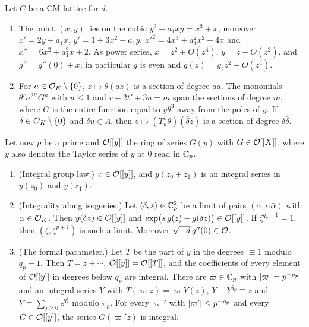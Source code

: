 \begin{theorem}\label{thm:cm-background}
Let $C$ be a CM lattice for $d$.
\begin{enumerate}[label=\textup{(\roman*)}]
\item\label{it:cm-weierstrass} The point $(x,y)$ lies on the cubic $y^2+a_1xy=x^3+x$; moreover
$x'=2y+a_1x$, $y'=1+3x^2-a_1y$, $x'^2=4x^3+a_1^2x^2+4x$ and $x''=6x^2+a_1^2x+2$. As power series,
$x=z^2+O(z^4)$, $y=z+O(z^2)$, and $g''=g''(0)+x$; in particular $g$ is even and $g(z)=g_2z^2+O(z^4)$.
\item\label{it:cm-sections} For $a\in\mathcal{O}_K\setminus\{0\}$, $z\mapsto\theta(az)$ is a section of degree
$a\bar a$. The monomials $\theta^{r}\sigma^{2t'}G^{u}$ with $u\le1$ and $r+2t'+3u=m$ span the sections
of degree $m$, where $G$ is the entire function equal to $y\theta^3$ away from the poles of $y$. If
$\delta\in\mathcal{O}_K\setminus\{0\}$ and $\delta u\in\Lambda$, then $z\mapsto(T^1_u\theta)(\bar\delta z)$ is
a section of degree $\delta\bar\delta$.
\end{enumerate}
Let now $p$ be a prime and $\mathcal{O}[[y]]$ the ring of series $G(y)$ with $G\in\mathcal{O}[[X]]$, where $y$ also
denotes the Taylor series of $y$ at $0$ read in $\mathbb{C}_p$.
\begin{enumerate}[label=\textup{(\roman*)},resume]
\item\label{it:cm-group-law} (Integral group law.) $x\in\mathcal{O}[[y]]$, and $y(z_0+z_1)$ is an integral
series in $y(z_0)$ and $y(z_1)$.
\item\label{it:cm-isogeny} (Integrality along isogenies.) Let $(\delta,s)\in\mathbb{C}_p^2$ be a limit of pairs
$(\alpha,\alpha\bar\alpha)$ with $\alpha\in\mathcal{O}_K$. Then $y(\delta z)\in\mathcal{O}[[y]]$ and
$\exp\bigl(s\,g(z)-g(\delta z)\bigr)\in\mathcal{O}[[y]]$. If $\zeta^{q_p-1}=1$, then $(\zeta,\zeta^{p+1})$ is
such a limit. Moreover $\sqrt{-d}\,g''(0)\in\mathcal{O}$.
\item\label{it:cm-formal} (The formal parameter.) Let $T$ be the part of $y$ in the degrees $\equiv1$
modulo $q_p-1$. Then $T=z+\cdots$, $\mathcal{O}[[y]]=\mathcal{O}[[T]]$, and the coefficients of every element of
$\mathcal{O}[[y]]$ in degrees below $q_p$ are integral. There are $\varpi\in\mathbb{C}_p$ with $\lvert \varpi\rvert=p^{-\rho_p}$
and an integral series $Y$ with $T(\varpi z)=\varpi Y(z)$, $Y-Y^{q_p}\equiv z$ and
$Y\equiv\sum_{j\ge0}z^{q_p^j}$ modulo $\pi_p$. For every $\varpi'$ with $\lvert \varpi'\rvert\le p^{-\rho_p}$
and every $G\in\mathcal{O}[[y]]$, the series $G(\varpi'z)$ is integral.
\end{enumerate}
\end{theorem}
